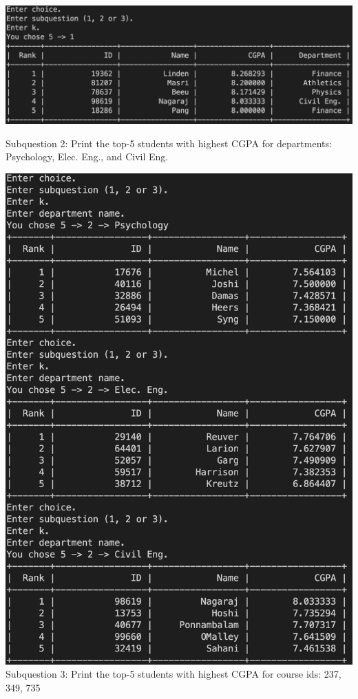 \documentclass[12pt]{amsart}
\begin{document}
    \includegraphics[scale = 0.5]{5_1.png}

    Subquestion 2: Print the top-5 students with highest CGPA  for departments: Psychology, Elec. Eng., and Civil Eng.


    \includegraphics[scale = 0.5]{5_2.png}
\newpage
    Subquestion 3: Print the top-5 students with highest CGPA  for  course ids: 237, 349, 735
\end{document}
